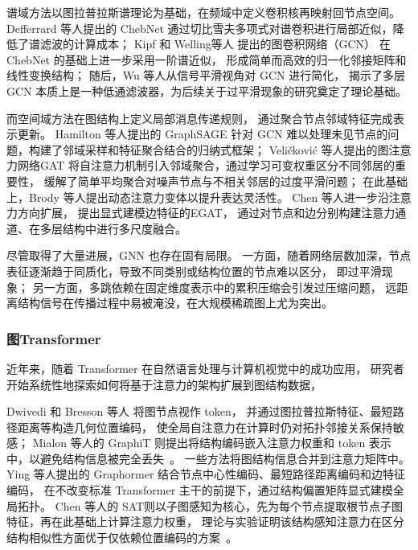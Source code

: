 谱域方法以图拉普拉斯谱理论为基础，在频域中定义卷积核再映射回节点空间。
Defferrard 等人\cite{Defferrard2016ConvolutionalNN}提出的 ChebNet
通过切比雪夫多项式对谱卷积进行局部近似，降低了谱滤波的计算成本；
Kipf 和 Welling等人\cite{Kipf2016SemiSupervisedCW} 提出的图卷积网络（GCN）
在 ChebNet 的基础上进一步采用一阶谱近似，
形成简单而高效的归一化邻接矩阵和线性变换结构；
随后，Wu 等人\cite{Wu2019SimplifyingGC}从信号平滑视角对 GCN 进行简化，
揭示了多层 GCN 本质上是一种低通滤波器，为后续关于过平滑现象的研究奠定了理论基础。

而空间域方法在图结构上定义局部消息传递规则，
通过聚合节点邻域特征完成表示更新。
Hamilton 等人\cite{Hamilton2017InductiveRL}提出的 GraphSAGE
针对 GCN 难以处理未见节点的问题，构建了邻域采样和特征聚合结合的归纳式框架；
Veličković 等人\cite{Velickovic2017GraphAN}提出的图注意力网络GAT
将自注意力机制引入邻域聚合，通过学习可变权重区分不同邻居的重要性，
缓解了简单平均聚合对噪声节点与不相关邻居的过度平滑问题；
在此基础上，Brody 等人\cite{Brody2021HowAA}提出动态注意力变体以提升表达灵活性。
Chen 等人\cite{Chen2021EdgeFeaturedGA}进一步沿注意力方向扩展，
提出显式建模边特征的EGAT，
通过对节点和边分别构建注意力通道、在多层结构中进行多尺度融合。

尽管取得了大量进展，GNN 也存在固有局限。
一方面，随着网络层数加深，节点表征逐渐趋于同质化，导致不同类别或结构位置的节点难以区分，
即过平滑现象\cite{Rusch2023ASO}；
另一方面，多跳依赖在固定维度表示中的累积压缩会引发过压缩问题\cite{Alon2020OnTB}，
远距离结构信号在传播过程中易被淹没，在大规模稀疏图上尤为突出。

\subsubsection{图Transformer}

近年来，随着 Transformer \cite{Vaswani2017AttentionIA}在自然语言处理\cite{Lin2021ASO}与计算机视觉中\cite{Han2020ASO}的成功应用，
研究者开始系统性地探索如何将基于注意力的架构扩展到图结构数据，

Dwivedi 和 Bresson 等人 \cite{Dwivedi2020AGO}将图节点视作 token，
并通过图拉普拉斯特征、最短路径距离等构造几何位置编码，
使全局自注意力在计算时仍对拓扑邻接关系保持敏感；
Mialon 等人\cite{Mialon2021GraphiTEG}的 GraphiT 
则提出将结构编码嵌入注意力权重和 token 表示中，以避免结构信息被完全丢失\ 。
一些方法将图结构信息合并到注意力矩阵中。
Ying 等人\cite{Ying2021DoTR}提出的 Graphormer 结合节点中心性编码、最短路径距离编码和边特征编码，
在不改变标准 Transformer 主干的前提下，通过结构偏置矩阵显式建模全局拓扑。
Chen 等人\cite{Chen2022StructureAwareTF}的
SAT则以子图感知为核心，先为每个节点提取根节点子图特征，再在此基础上计算注意力权重，
理论与实验证明该结构感知注意力在区分结构相似性方面优于仅依赖位置编码的方案\ 。

